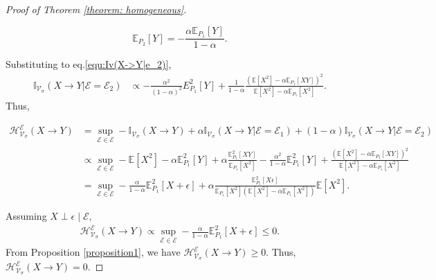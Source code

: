 \begin{proof}[Proof of Theorem \ref{theorem: homogeneous}]
\begin{small}
\begin{equation}
    \mathbb  E_{P_2}[Y] = - \frac{\alpha \mathbb E_{P_1}[Y]}{1-\alpha}.
\end{equation}
\end{small}
Substituting to eq.\ref{equ:Iv(X->Y|e_2)},
\begin{align}
    \mathbb{I}_{\mathcal{V}_\sigma}(X\rightarrow Y|\mathcal E=\mathcal E_2) &\propto -\frac{\alpha^2}{(1-\alpha)^2}E_{P_1}^2[Y] + \frac{1}{1-\alpha}\frac{\left(\mathbb E[X^2] - \alpha \mathbb E_{P_1}[XY]\right)^2}{\mathbb E[X^2] - \alpha \mathbb E_{P_1}[X^2]}.
\end{align}
Thus,
\begin{small}
\begin{align}
    \mathcal H_{\mathcal V_\sigma}^{\mathscr E}(X \rightarrow Y) &= \sup_{\mathcal E \in \mathscr E} -\mathbb{I}_{\mathcal{V}_\sigma}(X\rightarrow Y) + \alpha \mathbb{I}_{\mathcal{V}_\sigma}(X\rightarrow Y|\mathcal E=\mathcal E_1) + (1-\alpha) \mathbb{I}_{\mathcal{V}_\sigma}(X\rightarrow Y|\mathcal E=\mathcal E_2) \\
    &\propto \sup_{\mathcal E \in \mathscr E} -\mathbb E[X^2] - \alpha \mathbb E_{P_1}^2[Y] + \alpha \frac{\mathbb E_{P_1}^2[XY]}{\mathbb E_{P_1}[X^2]} - \frac{\alpha^2}{1-\alpha} \mathbb E_{P_1}^2[Y] + \frac{\left(\mathbb E[X^2] - \alpha \mathbb E_{P_1}[XY]\right)^2}{\mathbb E[X^2] - \alpha \mathbb E_{P_1}[X^2]} \\
    &= \sup_{\mathcal E \in \mathscr E} -\frac{\alpha}{1-\alpha}\mathbb E_{P_1}^2[X+\epsilon] + \alpha \frac{\mathbb E_{P_1}^2[X\epsilon]}{\mathbb E_{P_1}[X^2]\left(\mathbb E[X^2] - \alpha \mathbb E_{P_1}[X^2]\right)} \mathbb E[X^2].
\end{align}
\end{small}
Assuming $X \perp \epsilon \;|\; \mathcal E$, 
\begin{align}
    \mathcal H_{\mathcal V_\sigma}^{\mathscr E}(X \rightarrow Y) \propto \sup_{\mathcal E \in \mathscr E} -\frac{\alpha}{1-\alpha}\mathbb E_{P_1}^2[X+\epsilon] \leq 0.
\end{align}
From Proposition \ref{proposition1}, we have $\mathcal H_{\mathcal V_\sigma}^{\mathscr E}(X \rightarrow Y) \geq 0$. Thus, $\mathcal H_{\mathcal V_\sigma}^{\mathscr E}(X \rightarrow Y) = 0$.
\end{proof}


